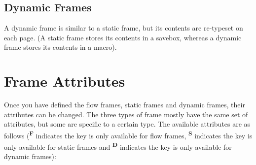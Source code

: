 \documentclass[a4paper,twoside]{report}
\begin{document}
\section{Dynamic Frames}

A dynamic frame is similar to a static frame, but its contents
are re-typeset on each page. (A static frame stores its
contents in a savebox, whereas a dynamic frame stores its
contents in a macro).

\chapter{Frame Attributes}
\label{sec:modattr}

Once you have defined the {flow frames}, {static frames} and
{dynamic frames}, their attributes can be changed.
The three types of frame mostly have the
same set of attributes, but some are specific to a certain type.
The available attributes are as follows
(\textsuperscript{\textbf{F}} indicates the key is
only available for {flow frames},
\textsuperscript{\textbf{S}} indicates the key is only available
for {static frames}
and \textsuperscript{\textbf{D}} indicates the key
is only available for {dynamic frames}):
\end{document}
